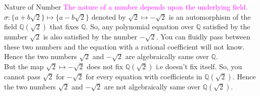 \documentclass{beamer}
\begin{document}
    \begin{frame}{Nature of Number}
  \textcolor{magenta}{The nature of a number depends upon the underlying field.}\\
  \(\sigma: \{a + b\sqrt{2}\} \mapsto \{a - b\sqrt{2}\} \) denoted by \(\sqrt{2} \longmapsto -\sqrt{2}\) is an automorphism of the field \(\mathbb{Q}(\sqrt{2})\) that fixes \(\mathbb{Q}\). So,  any polynomial equation over \(\mathbb{Q}\) satisfied by the number \(\sqrt{2}\) is also satisfied by the number \(-\sqrt{2}\). You can fluidly pass between these two numbers and the equation with a rational coefficient will not know. \textcolor{green!50!black}{Hence the two numbers \(\sqrt{2}\) and \(-\sqrt{2}\) are algebraically same over \(\mathbb{Q}\).}\\[4mm]

But the map \(\sqrt{2} \longmapsto -\sqrt{2}\) does not fix  \(\mathbb{Q}(\sqrt{2})\) i.e doesn't fix itself. So, you cannot pass \(\sqrt{2}\) for \(-\sqrt{2}\) for every equation with coefficients in \(\mathbb{Q}(\sqrt{2})\). \textcolor{green!50!black}{Hence the two numbers \(\sqrt{2}\) and \(-\sqrt{2}\) are not algebraically same over \(\mathbb{Q}(\sqrt{2})\).}
\vspace{2mm}

\begin{figure}[h]
  \centering
  \end{figure}
\end{frame}
\end{document}
